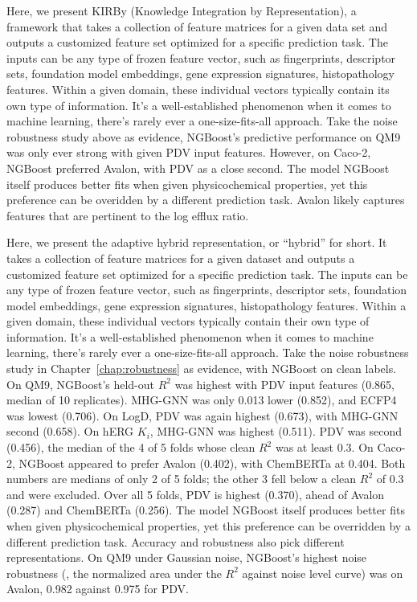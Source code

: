 Here, we present KIRBy (Knowledge Integration by Representation), a framework that takes a collection of feature matrices for a given data set and outputs a customized feature set optimized for a specific prediction task. The inputs can be any type of frozen feature vector, such as fingerprints, descriptor sets, foundation model embeddings, gene expression signatures, histopathology features. Within a given domain, these individual vectors typically contain its own type of information. It's a well-established phenomenon when it comes to machine learning, there's rarely ever a one-size-fits-all approach. Take the noise robustness study above as evidence, NGBoost's predictive performance on QM9 was only ever strong with given PDV input features. However, on Caco-2, NGBoost preferred Avalon, with PDV as a close second. The model NGBoost itself produces better fits when given physicochemical properties, yet this preference can be overidden by a different prediction task. Avalon likely captures features that are pertinent to the log efflux ratio.

Here, we present the adaptive hybrid representation, or ``hybrid'' for short. It takes a collection of feature matrices for a given dataset and outputs a customized feature set optimized for a specific prediction task. The inputs can be any type of frozen feature vector, such as fingerprints, descriptor sets, foundation model embeddings, gene expression signatures, histopathology features. Within a given domain, these individual vectors typically contain their own type of information. It's a well-established phenomenon when it comes to machine learning, there's rarely ever a one-size-fits-all approach. Take the noise robustness study in Chapter~\ref{chap:robustness} as evidence, with NGBoost on clean labels. On QM9, NGBoost's held-out $R^2$ was highest with PDV input features (0.865, median of 10 replicates). MHG-GNN was only 0.013 lower (0.852), and ECFP4 was lowest (0.706). On LogD, PDV was again highest (0.673), with MHG-GNN second (0.658). On hERG $K_i$, MHG-GNN was highest (0.511). PDV was second (0.456), the median of the 4 of 5 folds whose clean $R^2$ was at least 0.3. On Caco-2, NGBoost appeared to prefer Avalon (0.402), with ChemBERTa at 0.404. Both numbers are medians of only 2 of 5 folds; the other 3 fell below a clean $R^2$ of 0.3 and were excluded. Over all 5 folds, PDV is highest (0.370), ahead of Avalon (0.287) and ChemBERTa (0.256). The model NGBoost itself produces better fits when given physicochemical properties, yet this preference can be overridden by a different prediction task. Accuracy and robustness also pick different representations. On QM9 under Gaussian noise, NGBoost's highest noise robustness (\aucnorm, the normalized area under the $R^2$ against noise level curve) was on Avalon, 0.982 against 0.975 for PDV.

